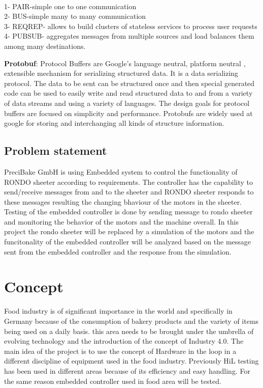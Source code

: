 \documentclass{listhesis}
\begin{document}
\\
1- PAIR-simple one to one communication\\
2- BUS-simple many to many communication\\
3- REQREP- allows to build clusters of stateless services to process user requests\\
4- PUBSUB- aggregates messages from multiple sources and load balances them among many destinations.\\
\par
\textbf{Protobuf}: Protocol Buffers are Google’s language neutral, platform neutral , extensible mechanism for serializing structured data. It is a data serializing protocol. The data to be sent can be structured once and then special generated code can be used to easily write and read structured data to and from a variety of data streams and using a variety of languages.  The design goals for protocol buffers are focused on simplicity and performance. Protobufs are widely used at google for storing and interchanging all kinds of structure information. 
\\

\section{Problem statement}
PreciBake GmbH is using Embedded system to control the functionality of RONDO sheeter according to requirements. The controller has the capability to send/receive messages from and to the sheeter and RONDO sheeter responds to these messages resulting the changing bhaviour of the motors in the sheeter. Testing of the embedded controller is done by sending message to rondo sheeter and monitoring the behavior of the motors and the machine overall. In this project the rondo sheeter will be replaced by a simulation of the motors and the funcitonality of the embedded controller will be analyzed based on the message sent from the embedded controller and the response from the simulation.

\chapter{Concept}

Food industry is of significant importance in the world and specifically in Germany because of the consumption of bakery products and the variety of items being used on a daily basis. this area needs to be brought under the umbrella of evolving technology and the introduction of the concept of Industry 4.0. The main idea of the project is to use the concept of Hardware in the loop in a different discipline of equipment used in the food industry. Previously HiL testing has been used in different areas because of its efficiency and easy handling. For the same reason embedded controller used in food area will be tested.
\end{document}
